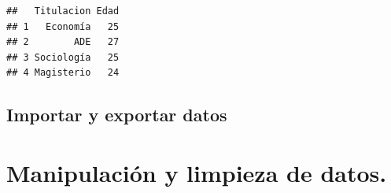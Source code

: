 \documentclass[
]{book}
\begin{document}
\begin{verbatim}
##   Titulacion Edad
## 1   Economía   25
## 2        ADE   27
## 3 Sociología   25
## 4 Magisterio   24
\end{verbatim}

\hypertarget{importar-y-exportar-datos}{%
\subsection{Importar y exportar datos}\label{importar-y-exportar-datos}}

\hypertarget{manipulaciuxf3n-y-limpieza-de-datos.}{%
\section{Manipulación y limpieza de datos.}\label{manipulaciuxf3n-y-limpieza-de-datos.}}

  
\end{document}
